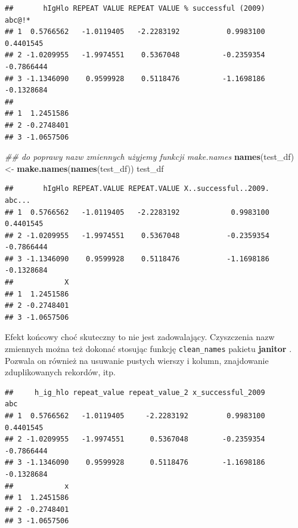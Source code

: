 \documentclass[]{book}
\newenvironment{Shaded}{\begin{snugshade}}{\end{snugshade}}
\newcommand{\CommentTok}[1]{\textcolor[rgb]{0.56,0.35,0.01}{\textit{#1}}}
\newcommand{\KeywordTok}[1]{\textcolor[rgb]{0.13,0.29,0.53}{\textbf{#1}}}
\newcommand{\NormalTok}[1]{#1}
\newcommand{\OperatorTok}[1]{\textcolor[rgb]{0.81,0.36,0.00}{\textbf{#1}}}
\newcommand{\StringTok}[1]{\textcolor[rgb]{0.31,0.60,0.02}{#1}}
\theoremstyle{plain}
\theoremstyle{definition}
\begin{document}
\begin{verbatim}
##       hIgHlo REPEAT VALUE REPEAT VALUE % successful (2009)     abc@!*
## 1  0.5766562   -1.0119405   -2.2283192           0.9983100  0.4401545
## 2 -1.0209955   -1.9974551    0.5367048          -0.2359354 -0.7866444
## 3 -1.1346090    0.9599928    0.5118476          -1.1698186 -0.1328684
##             
## 1  1.2451586
## 2 -0.2748401
## 3 -1.0657506
\end{verbatim}

\begin{Shaded}
\begin{Highlighting}[]
\CommentTok{## do poprawy nazw zmiennych użyjemy funkcji make.names}
\KeywordTok{names}\NormalTok{(test_df) <-}\StringTok{ }\KeywordTok{make.names}\NormalTok{(}\KeywordTok{names}\NormalTok{(test_df))}
\NormalTok{test_df}
\end{Highlighting}
\end{Shaded}

\begin{verbatim}
##       hIgHlo REPEAT.VALUE REPEAT.VALUE X..successful..2009.     abc...
## 1  0.5766562   -1.0119405   -2.2283192            0.9983100  0.4401545
## 2 -1.0209955   -1.9974551    0.5367048           -0.2359354 -0.7866444
## 3 -1.1346090    0.9599928    0.5118476           -1.1698186 -0.1328684
##            X
## 1  1.2451586
## 2 -0.2748401
## 3 -1.0657506
\end{verbatim}

Efekt końcowy choć skuteczny to nie jest zadowalający. Czyszczenia nazw zmiennych można też dokonać stosując funkcję \texttt{clean\_names} pakietu \textbf{janitor} \citep{R-janitor}. Pozwala on również na usuwanie pustych wierszy i kolumn, znajdowanie zduplikowanych rekordów, itp.

\begin{Shaded}
\end{Shaded}

\begin{verbatim}
##     h_ig_hlo repeat_value repeat_value_2 x_successful_2009        abc
## 1  0.5766562   -1.0119405     -2.2283192         0.9983100  0.4401545
## 2 -1.0209955   -1.9974551      0.5367048        -0.2359354 -0.7866444
## 3 -1.1346090    0.9599928      0.5118476        -1.1698186 -0.1328684
##            x
## 1  1.2451586
## 2 -0.2748401
## 3 -1.0657506
\end{verbatim}
\end{document}
